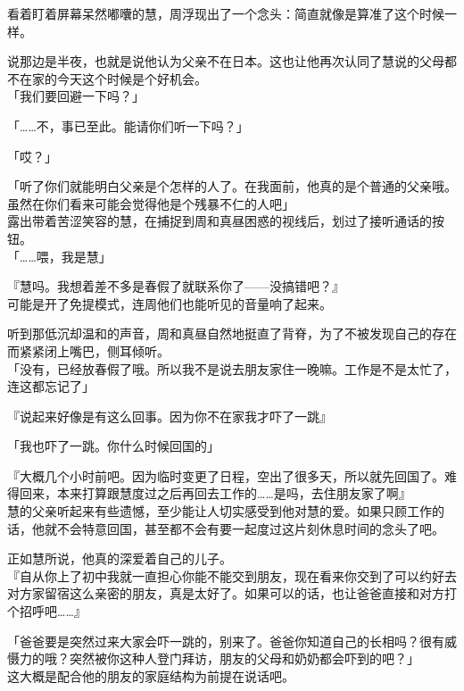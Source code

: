 看着盯着屏幕呆然嘟囔的慧，周浮现出了一个念头：简直就像是算准了这个时候一样。

说那边是半夜，也就是说他认为父亲不在日本。这也让他再次认同了慧说的父母都不在家的今天这个时候是个好机会。\\

「我们要回避一下吗？」

「……不，事已至此。能请你们听一下吗？」

「哎？」

「听了你们就能明白父亲是个怎样的人了。在我面前，他真的是个普通的父亲哦。虽然在你们看来可能会觉得他是个残暴不仁的人吧」\\

露出带着苦涩笑容的慧，在捕捉到周和真昼困惑的视线后，划过了接听通话的按钮。\\

「……喂，我是慧」

『慧吗。我想着差不多是春假了就联系你了——没搞错吧？』\\

可能是开了免提模式，连周他们也能听见的音量响了起来。

听到那低沉却温和的声音，周和真昼自然地挺直了背脊，为了不被发现自己的存在而紧紧闭上嘴巴，侧耳倾听。\\

「没有，已经放春假了哦。所以我不是说去朋友家住一晚嘛。工作是不是太忙了，连这都忘记了」

『说起来好像是有这么回事。因为你不在家我才吓了一跳』

「我也吓了一跳。你什么时候回国的」

『大概几个小时前吧。因为临时变更了日程，空出了很多天，所以就先回国了。难得回来，本来打算跟慧度过之后再回去工作的……是吗，去住朋友家了啊』\\

慧的父亲听起来有些遗憾，至少能让人切实感受到他对慧的爱。如果只顾工作的话，他就不会特意回国，甚至都不会有要一起度过这片刻休息时间的念头了吧。

正如慧所说，他真的深爱着自己的儿子。\\

『自从你上了初中我就一直担心你能不能交到朋友，现在看来你交到了可以约好去对方家留宿这么亲密的朋友，真是太好了。如果可以的话，也让爸爸直接和对方打个招呼吧……』

「爸爸要是突然过来大家会吓一跳的，别来了。爸爸你知道自己的长相吗？很有威慑力的哦？突然被你这种人登门拜访，朋友的父母和奶奶都会吓到的吧？」\\

这大概是配合他的朋友的家庭结构为前提在说话吧。

